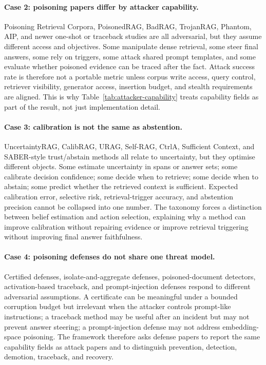 \paragraph{Case 2: poisoning papers differ by attacker capability.}
Poisoning Retrieval Corpora, PoisonedRAG, BadRAG, TrojanRAG, Phantom, AIP, and newer one-shot or traceback studies are all adversarial, but they assume different access and objectives. Some manipulate dense retrieval, some steer final answers, some rely on triggers, some attack shared prompt templates, and some evaluate whether poisoned evidence can be traced after the fact. Attack success rate is therefore not a portable metric unless corpus write access, query control, retriever visibility, generator access, insertion budget, and stealth requirements are aligned. This is why Table~\ref{tab:attacker-capability} treats capability fields as part of the result, not just implementation detail.

\paragraph{Case 3: calibration is not the same as abstention.}
UncertaintyRAG, CalibRAG, URAG, Self-RAG, CtrlA, Sufficient Context, and SABER-style trust/abstain methods all relate to uncertainty, but they optimise different objects. Some estimate uncertainty in spans or answer sets; some calibrate decision confidence; some decide when to retrieve; some decide when to abstain; some predict whether the retrieved context is sufficient. Expected calibration error, selective risk, retrieval-trigger accuracy, and abstention precision cannot be collapsed into one number. The taxonomy forces a distinction between belief estimation and action selection, explaining why a method can improve calibration without repairing evidence or improve retrieval triggering without improving final answer faithfulness.

\paragraph{Case 4: poisoning defenses do not share one threat model.}
Certified defenses, isolate-and-aggregate defenses, poisoned-document detectors, activation-based traceback, and prompt-injection defenses respond to different adversarial assumptions. A certificate can be meaningful under a bounded corruption budget but irrelevant when the attacker controls prompt-like instructions; a traceback method may be useful after an incident but may not prevent answer steering; a prompt-injection defense may not address embedding-space poisoning. The framework therefore asks defense papers to report the same capability fields as attack papers and to distinguish prevention, detection, demotion, traceback, and recovery.

